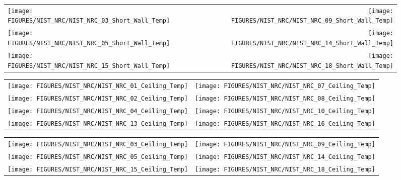 \begin{figure}[p]
\begin{tabular*}{\textwidth}{l@{\extracolsep{\fill}}r}
\texttt{[image: FIGURES/NIST\_NRC/NIST\_NRC\_03\_Short\_Wall\_Temp]} &
\texttt{[image: FIGURES/NIST\_NRC/NIST\_NRC\_09\_Short\_Wall\_Temp]} \\
\texttt{[image: FIGURES/NIST\_NRC/NIST\_NRC\_05\_Short\_Wall\_Temp]} &
\texttt{[image: FIGURES/NIST\_NRC/NIST\_NRC\_14\_Short\_Wall\_Temp]} \\
\texttt{[image: FIGURES/NIST\_NRC/NIST\_NRC\_15\_Short\_Wall\_Temp]} &
\texttt{[image: FIGURES/NIST\_NRC/NIST\_NRC\_18\_Short\_Wall\_Temp]}
\end{tabular*}
\label{NIST_NRC_Short_Wall_Temp_Open}
\end{figure}

\begin{figure}[p]
\begin{tabular*}{\textwidth}{l@{\extracolsep{\fill}}r}
\texttt{[image: FIGURES/NIST\_NRC/NIST\_NRC\_01\_Ceiling\_Temp]} &
\texttt{[image: FIGURES/NIST\_NRC/NIST\_NRC\_07\_Ceiling\_Temp]} \\
\texttt{[image: FIGURES/NIST\_NRC/NIST\_NRC\_02\_Ceiling\_Temp]} &
\texttt{[image: FIGURES/NIST\_NRC/NIST\_NRC\_08\_Ceiling\_Temp]} \\
\texttt{[image: FIGURES/NIST\_NRC/NIST\_NRC\_04\_Ceiling\_Temp]} &
\texttt{[image: FIGURES/NIST\_NRC/NIST\_NRC\_10\_Ceiling\_Temp]} \\
\texttt{[image: FIGURES/NIST\_NRC/NIST\_NRC\_13\_Ceiling\_Temp]} &
\texttt{[image: FIGURES/NIST\_NRC/NIST\_NRC\_16\_Ceiling\_Temp]}
\end{tabular*}
\label{NIST_NRC_Ceiling_Temp_Closed}
\end{figure}

\begin{figure}[p]
\begin{tabular*}{\textwidth}{l@{\extracolsep{\fill}}r}
\texttt{[image: FIGURES/NIST\_NRC/NIST\_NRC\_03\_Ceiling\_Temp]} &
\texttt{[image: FIGURES/NIST\_NRC/NIST\_NRC\_09\_Ceiling\_Temp]} \\
\texttt{[image: FIGURES/NIST\_NRC/NIST\_NRC\_05\_Ceiling\_Temp]} &
\texttt{[image: FIGURES/NIST\_NRC/NIST\_NRC\_14\_Ceiling\_Temp]} \\
\texttt{[image: FIGURES/NIST\_NRC/NIST\_NRC\_15\_Ceiling\_Temp]} &
\texttt{[image: FIGURES/NIST\_NRC/NIST\_NRC\_18\_Ceiling\_Temp]}
\end{tabular*}
\label{NIST_NRC_Ceiling_Temp_Open}
\end{figure}

